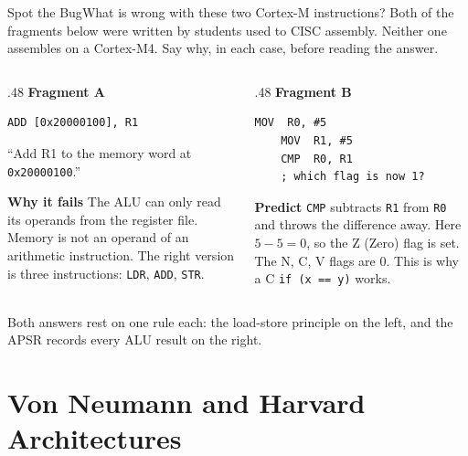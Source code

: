 \documentclass[9pt,aspectratio=169,xcolor=table]{beamer}
\begin{document}
\begin{frame}[fragile]{Spot the Bug}{What is wrong with these two Cortex-M instructions?}
    \leavevmode
    Both of the fragments below were written by students used to CISC assembly. Neither one assembles on a Cortex-M4. Say why, in each case, before reading the answer.

    \vspace{3mm}
    \begin{columns}[T]
    \begin{column}{.48\textwidth}
        \textbf{Fragment A}
\begin{lstlisting}[language=ARM, basicstyle=\ttfamily\footnotesize]
    ADD [0x20000100], R1
\end{lstlisting}
        {\footnotesize ``Add R1 to the memory word at \texttt{0x20000100}.''}

        \vspace{2mm}
        \textbf{Why it fails}
        {\footnotesize The ALU can only read its operands from the register file. Memory is \alert{not} an operand of an arithmetic instruction. The right version is three instructions: \texttt{LDR}, \texttt{ADD}, \texttt{STR}.}
    \end{column}
    \begin{column}{.48\textwidth}
        \textbf{Fragment B}
\begin{lstlisting}[language=ARM, basicstyle=\ttfamily\footnotesize]
    MOV  R0, #5
    MOV  R1, #5
    CMP  R0, R1
    ; which flag is now 1?
\end{lstlisting}

        \textbf{Predict}
        {\footnotesize \texttt{CMP} subtracts \texttt{R1} from \texttt{R0} and throws the difference away. Here $5 - 5 = 0$, so the \alert{Z (Zero) flag} is set. The N, C, V flags are 0. This is why a C \texttt{if (x == y)} works.}
    \end{column}
    \end{columns}

    \vspace{2mm}
    {\small\centering Both answers rest on one rule each: the \alert{load-store principle} on the left, and the \alert{APSR records every ALU result} on the right.\par}
\end{frame}

\section{Von Neumann and Harvard Architectures}
\end{document}
